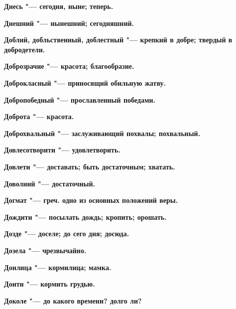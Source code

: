 \bfseries Днесь \normalfont{} "--- сегодня, ныне; теперь. 




\bfseries Днешний \normalfont{} "--- нынешний; сегодняшний. 




\bfseries Доблий, добльственный, доблестный \normalfont{} "--- крепкий в добре; твердый в добродетели. 




\bfseries Доброзрачие \normalfont{} "--- красота; благообразие. 




\bfseries Доброкласный \normalfont{} "--- приносящий обильную жатву. 




\bfseries Добропобедный \normalfont{} "--- прославленный победами. 




\bfseries Доброта \normalfont{} "--- красота. 




\bfseries Доброхвальный \normalfont{} "--- заслуживающий похвалы; похвальный. 




\bfseries Довлесотворити \normalfont{} "--- удовлетворить. 




\bfseries Довлети \normalfont{} "--- доставать; быть достаточным; хватать. 




\bfseries Доволний \normalfont{} "--- достаточный. 




\bfseries Догмат \normalfont{} "--- греч. одно из основных положений веры. 




\bfseries Дождити \normalfont{} "--- посылать дождь; кропить; орошать. 




\bfseries Дозде \normalfont{} "--- доселе; до сего дня; досюда. 




\bfseries Дозела \normalfont{} "--- чрезвычайно. 




\bfseries Доилица \normalfont{} "--- кормилица; мамка. 




\bfseries Доити \normalfont{} "--- кормить грудью. 




\bfseries Доколе \normalfont{} "--- до какого времени? долго ли? 




